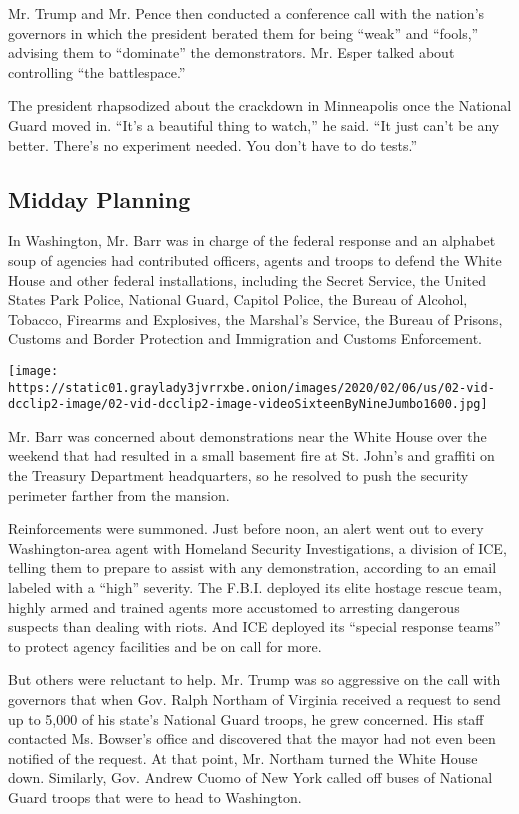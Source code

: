 Mr. Trump and Mr. Pence then conducted a conference call with the
nation's governors in which the president berated them for being
``weak'' and ``fools,'' advising them to ``dominate'' the demonstrators.
Mr. Esper talked about controlling ``the battlespace.''

The president rhapsodized about the crackdown in Minneapolis once the
National Guard moved in. ``It's a beautiful thing to watch,'' he said.
``It just can't be any better. There's no experiment needed. You don't
have to do tests.''

\hypertarget{midday-planning}{%
\subsection{Midday Planning}\label{midday-planning}}

In Washington, Mr. Barr was in charge of the federal response and an
alphabet soup of agencies had contributed officers, agents and troops to
defend the White House and other federal installations, including the
Secret Service, the United States Park Police, National Guard, Capitol
Police, the Bureau of Alcohol, Tobacco, Firearms and Explosives, the
Marshal's Service, the Bureau of Prisons, Customs and Border Protection
and Immigration and Customs Enforcement.

\texttt{[image: https://static01.graylady3jvrrxbe.onion/images/2020/02/06/us/02-vid-dcclip2-image/02-vid-dcclip2-image-videoSixteenByNineJumbo1600.jpg]}

Mr. Barr was concerned about demonstrations near the White House over
the weekend that had resulted in a small basement fire at St. John's and
graffiti on the Treasury Department headquarters, so he resolved to push
the security perimeter farther from the mansion.

Reinforcements were summoned. Just before noon, an alert went out to
every Washington-area agent with Homeland Security Investigations, a
division of ICE, telling them to prepare to assist with any
demonstration, according to an email labeled with a ``high'' severity.
The F.B.I. deployed its elite hostage rescue team, highly armed and
trained agents more accustomed to arresting dangerous suspects than
dealing with riots. And ICE deployed its ``special response teams'' to
protect agency facilities and be on call for more.

But others were reluctant to help. Mr. Trump was so aggressive on the
call with governors that when Gov. Ralph Northam of Virginia received a
request to send up to 5,000 of his state's National Guard troops, he
grew concerned. His staff contacted Ms. Bowser's office and discovered
that the mayor had not even been notified of the request. At that point,
Mr. Northam turned the White House down. Similarly, Gov. Andrew Cuomo of
New York called off buses of National Guard troops that were to head to
Washington.

